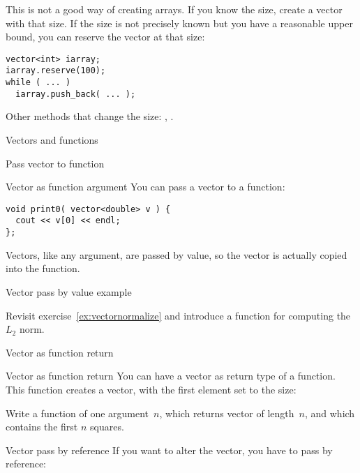 This is not a good way of creating arrays. If you know the size,
create a vector with that size. If the size is not precisely known but
you have a reasonable upper bound, you can 
reserve the vector at that size:
\begin{lstlisting}
vector<int> iarray;
iarray.reserve(100);
while ( ... )
  iarray.push_back( ... );
\end{lstlisting}

Other methods that change the size: , .

 {Vectors and functions}

 {Pass vector to function}

\begin{block}{Vector as function argument}
  \label{sl:vector-arg}
  You can pass a vector to a function:
\begin{lstlisting}
void print0( vector<double> v ) {
  cout << v[0] << endl;
};
\end{lstlisting}
Vectors, like any argument, are passed by value, so the vector is
actually copied into the function.
\end{block}

\begin{block}{Vector pass by value example}
  \label{sl:vector-arg-ex}
\end{block}

\begin{exercise}
  \label{ex:vectornormalize-function}
  Revisit exercise~\ref{ex:vectornormalize} and introduce a function
  for computing the $L_2$ norm.
\end{exercise}

 {Vector as function return}

\begin{block}{Vector as function return}
  \label{sl:vector-return}
  You can have a vector as return type of a function. This function
  creates a vector, with the first element set to the size:
\end{block}

\begin{exercise}
  \label{ex:vec-of-squares}
  Write a function of one  argument~$n$, which returns vector
  of length~$n$, and which contains the first $n$ squares.
\end{exercise}

\begin{block}{Vector pass by reference}
  \label{sl:vector-arg-ref}
  If you want to alter the vector, you have to pass by reference:
\end{block}


